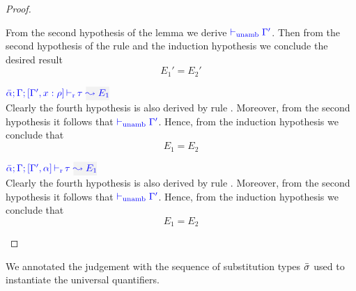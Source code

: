 \begin{proof}
\begin{description}
  From the second hypothesis of the lemma we derive ${\color{blue}  \vdash_{\mathrm{unamb}} \Gamma'}$.
  Then from the second hypothesis of the rule and the induction hypothesis we conclude
  the desired result
\begin{equation*}
  E_1' = E_2'
\end{equation*}

\item[\fbox{\rref{L-Var}}]\quad$\dlres{\bar{\alpha}}{\tenv}{\tenv',x:\rulet}{\type}{E_1}$\\

  Clearly the fourth hypothesis is also derived by rule .
  Moreover, from the second hypothesis it follows that ${\color{blue}  \vdash_{\mathrm{unamb}} \Gamma'}$.
  Hence, from the induction hypothesis we conclude that
\begin{equation*}
  E_1 = E_2
\end{equation*}

\item[\fbox{\rref{L-TyVar}}]\quad$\dlres{\bar{\alpha}}{\tenv}{\tenv',\alpha}{\type}{E_1}$\\
  Clearly the fourth hypothesis is also derived by rule .
  Moreover, from the second hypothesis it follows that ${\color{blue}  \vdash_{\mathrm{unamb}} \Gamma'}$.
  Hence, from the induction hypothesis we conclude that
\begin{equation*}
  E_1 = E_2
\end{equation*}
\end{description}
\end{proof}

We annotated the judgement with the sequence of substitution types $\bar{\sigma}$
used to instantiate the universal quantifiers.

